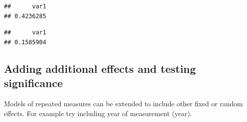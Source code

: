 \documentclass[
  12pt,
]{book}
\newenvironment{Shaded}{\begin{snugshade}}{\end{snugshade}}
\newcommand{\FloatTok}[1]{\textcolor[rgb]{0.00,0.00,0.81}{#1}}
\newcommand{\FunctionTok}[1]{\textcolor[rgb]{0.00,0.00,0.00}{#1}}
\newcommand{\NormalTok}[1]{#1}
\newcommand{\OtherTok}[1]{\textcolor[rgb]{0.56,0.35,0.01}{#1}}
\newcommand{\SpecialCharTok}[1]{\textcolor[rgb]{0.00,0.00,0.00}{#1}}
\newcommand{\StringTok}[1]{\textcolor[rgb]{0.31,0.60,0.02}{#1}}
\begin{document}
\begin{Shaded}
\end{Shaded}

\begin{verbatim}
##      var1 
## 0.4236285
\end{verbatim}

\begin{Shaded}
\end{Shaded}

\begin{verbatim}
##      var1 
## 0.1585904
\end{verbatim}

\hypertarget{adding-additional-effects-and-testing-significance-1}{%
\subsection{Adding additional effects and testing significance}\label{adding-additional-effects-and-testing-significance-1}}

Models of repeated measures can be extended to include other fixed or random effects.
For example try including year of measurement (year).
\end{document}
